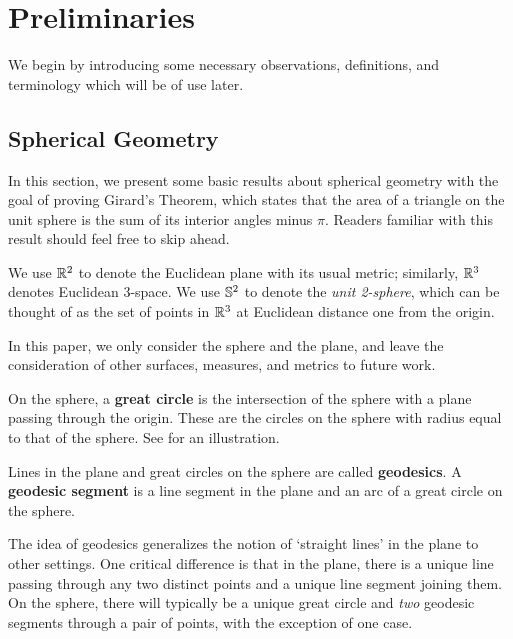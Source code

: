 \section{Preliminaries}\label{sec:prelims}

We begin by introducing some necessary observations, definitions, and terminology
which will be of use later.  
\subsection{Spherical Geometry}

In this section, we present some basic results about spherical geometry with the goal of proving Girard's Theorem, which states that the area of a triangle on the unit sphere is the sum of its interior angles minus $\pi$.  Readers familiar with this result should feel free to skip ahead.



We use $\mathbb{R}^2$ to denote the 
Euclidean plane with its usual metric;
similarly, $\mathbb{R}^3$ denotes Euclidean 3-space.  We use $\mathbb{S}^2$ to denote the \textit{unit 2-sphere}, which can be 
thought of as the set of points in $\mathbb{R}^3$ at Euclidean distance one from the origin.  
 
In this paper, we only consider the sphere and the plane, and leave the consideration of other surfaces, measures, and metrics to future work.







\begin{definition}
{On the sphere, a \textbf{great circle} is the intersection of the sphere with a plane passing through the origin.} These are the circles on the sphere with radius equal to that of the sphere.  See  for an illustration.
\end{definition}

\begin{definition}

Lines in the plane and great circles on the sphere are called \textbf{geodesics}.  A \textbf{geodesic segment} is a line segment in the plane and an arc of a great circle on the sphere.
	
\end{definition}  


{The idea of {geodesics} generalizes the notion of \enquote*{straight lines} in the plane to other settings.} One critical difference is that in the plane, there is a unique line passing through any two distinct points and a unique line segment joining them.  On the sphere, there will typically be a unique great circle and \textit{two} geodesic segments through a pair of points, with the exception of one case.









